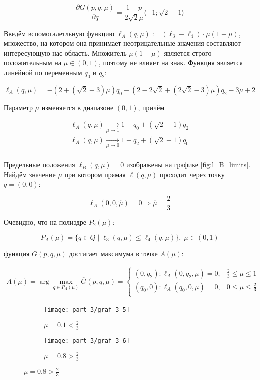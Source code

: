 \begin{flushleft}
	$$\frac{\partial \overline{G}(p,q,\mu)}{\partial q}=
	\frac{1+p}{2\sqrt{2}\mu} \langle -1;\sqrt{2}-1 \rangle 
 	$$
 	
	Введём вспомогалетльную функцию	
 	$\ell_A(q, \mu):=(\ell_3-\ell_4) \cdot \mu(1-\mu)$,
 	множество, на котором она принимает неотрицательные значения 
 	составляют интересующую нас область. Множитель $\mu(1-\mu)$ является строго
 	положительным на $\mu \in (0,1)$, поэтому не влияет на знак. Функция
 	является линейной по переменным $q_0$ и $q_2$:
 	
	$$\ell_A(q, \mu)=
	-(2+(\sqrt{2}-3)\mu)q_0
	-(2-2\sqrt{2}+(2\sqrt{2}-3)\mu)q_2
	-3\mu+2$$ 	
 	
	Параметр $\mu$ изменяется в диапазоне $(0,1)$, причём	
	
	\begin{gather*}	
	\ell_A(q,\mu) \xrightarrow[\mu\rightarrow 1]{} 
	1-q_0+(\sqrt{2}-1)q_2\\	
	\ell_A(q,\mu) \xrightarrow[\mu\rightarrow 0]{} 	
	1-q_2+(\sqrt{2}-1)q_0\\
	\end{gather*}
	
	Предельные положения $\ell_B(q, \mu)=0$ изображены на графике \eqref{fig:l_B_limits}.
	Найдём значение $\mu$ при котором прямая 
	$\ell(q, \mu)$ проходит через точку
	$q=(0,0)$:
	
	$$\ell_A(0,0,\hat \mu) = 0 \Rightarrow \hat \mu = \frac{2}{3}$$
	
	Очевидно, что на полиэдре $P_2(\mu):$
	
	$$P_A(\mu)=\{q \in Q \; | 
	\;  \ell_3(q, \mu) \leqslant \ell_4(q, \mu) \}, \; \mu \in (0,1)$$
	
	функция $\overline{G}(p,q,\mu)$ достигает максимума в точке $A(\mu):$
	
	\begin{gather*}
		A(\mu)= \arg \max \limits_{q\in P_A(\mu)} \overline G(p,q,\mu) =
		\begin{cases}
			(0, q_2) : \ell_A(0,q_2,\mu)=0, & \frac{2}{3} \leqslant \mu \leqslant 1 \\
			(q_0, 0) : \ell_A(q_0,0,\mu)=0, & 0 \leqslant \mu \leqslant \frac{2}{3} \\
		\end{cases}		
	\end{gather*}
	
	\begin{figure}[H]
    	\centering
     	\begin{subfigure}[b]{0.45 \textwidth}
        	\centering
        	\texttt{[image: part\_3/graf\_3\_5]}
        	\caption{$\mu=0.1 < \frac{2}{3}$}
         	\label{fig:y equals x}
     	\end{subfigure}
     	\hspace{10mm}
     	\begin{subfigure}[b]{0.45 \textwidth}
        	\centering
        	\texttt{[image: part\_3/graf\_3\_6]}
        	\caption{$\mu=0.8 > \frac{2}{3}$}
        	\label{fig:three sin x}
     	\end{subfigure}
	\end{figure}	
	

\end{flushleft}

